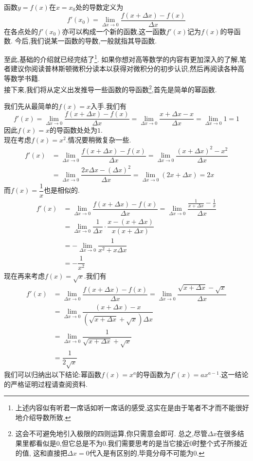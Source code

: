 \documentclass{ctexart}
\begin{document}
\begin{definition}[0A.1.1 导数]
    函数$y=f(x)$在$x=x_0$处的导数定义为
    \[f'\left(x_0\right)=\lim_{\Delta x\to 0}\dfrac{f\left(x+\Delta x\right)-f(x)}{\Delta x}\]
    在各点处的$f'\left(x_0\right)$亦可以构成一个新的函数,这一函数$f'(x)$记为$f(x)$的导函数.%
    今后,我们说某一函数的导数,一般就指其导函数.
\end{definition}
至此,基础的介绍就已经完结了\footnote{上述内容似有听君一席话如听一席话的感受,这实在是由于笔者不才而不能很好地介绍导数所致.}.%
如果你想对高等数学的内容有更加深入的了解,笔者建议你阅读普林斯顿微积分读本以获得对微积分的初步认识,然后再阅读各种高等数学书籍.\vspace{4pt}\\
\indent 接下来,我们将从定义出发推导一些函数的导函数\footnote{这会不可避免地引入极限的四则运算,你只需意会即可.%
总之,尽管$\Delta x$在很多结果里都看似是$0$,但它总是不为$0$.我们需要思考的是当它接近$0$时整个式子所接近的值,%
这和直接把$\Delta x=0$代入是有区别的,毕竟分母不可能为$0$.},首先是简单的幂函数.
\begin{derivation}
    我们先从最简单的$f(x)=x$入手.我们有
    \[f'(x)=\lim_{\Delta x\to0}\dfrac{f(x+\Delta x)-f(x)}{\Delta x}
    =\lim_{\Delta x\to0}\dfrac{x+\Delta x-x}{\Delta x}=\lim_{\Delta x\to0}1=1\]
    因此$f(x)=x$的导函数处处为$1$.\\
    现在考虑$f(x)=x^2$.情况要稍微复杂一些.
    \[\begin{aligned}
        f'(x)
        &= \lim_{\Delta x\to0}\dfrac{f(x+\Delta x)-f(x)}{\Delta x}=\lim_{\Delta x\to0}\dfrac{(x+\Delta x)^2-x^2}{\Delta x} \\
        &= \lim_{\Delta x\to0}\dfrac{2x\Delta x-(\Delta x)^2}{\Delta x}=\lim_{\Delta x\to0}(2x+\Delta x)=2x
    \end{aligned}\]
    而$f(x)=\dfrac1x$也是相似的.
    \[\begin{aligned}
        f'(x)
        &= \lim_{\Delta x\to0}\dfrac{f(x+\Delta x)-f(x)}{\Delta x}=\lim_{\Delta x\to0}\dfrac{\frac{1}{x+\Delta x}-\frac1x}{\Delta x} \\
        &= \lim_{\Delta x\to0}\dfrac{1}{\Delta x}\cdot\dfrac{x-(x+\Delta x)}{x(x+\Delta x)} \\
        &= -\lim_{\Delta x\to0}\dfrac{1}{x^2+x\Delta x} \\
        &= -\dfrac1{x^2}
    \end{aligned}\]
    现在再来考虑$f(x)=\sqrt{x}$.我们有
    \[\begin{aligned}
        f'(x)
        &= \lim_{\Delta x\to0}\dfrac{f(x+\Delta x)-f(x)}{\Delta x}=\lim_{\Delta x\to0}\dfrac{\sqrt{x+\Delta x}-\sqrt{x}}{\Delta x} \\
        &= \lim_{\Delta x\to0}\dfrac{(x+\Delta x)-x}{\left(\sqrt{x+\Delta x}+\sqrt{x}\right)\Delta x} \\
        &= \lim_{\Delta x\to0}\dfrac{1}{\sqrt{x+\Delta x}+\sqrt{x}} \\
        &= \dfrac{1}{2\sqrt{x}}
    \end{aligned}\]
    我们可以归纳出以下结论:幂函数$f(x)=x^a$的导函数为$f'(x)=ax^{a-1}$.这一结论的严格证明过程请查阅资料.
\end{derivation}
\end{document}
